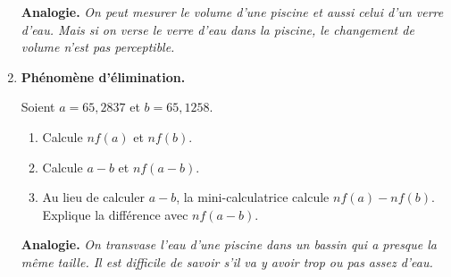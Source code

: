 \documentclass[class=report,crop=false, 12pt]{standalone}
\begin{document}
\begin{activite}
\begin{enumerate}
  
    \textbf{Analogie.} \emph{On peut mesurer le volume d'une piscine et aussi celui d'un verre d'eau. Mais si on verse le verre d'eau dans la piscine, le changement de volume n'est pas perceptible.} 
  
  \item \textbf{Phénomène d'élimination.}

    Soient $a = 65,2837$ et $b = 65,1258$.
  \begin{enumerate}
    \item Calcule $nf(a)$ et $nf(b)$.
    \item Calcule $a - b$ et $nf(a - b)$.
    \item Au lieu de calculer $a - b$, la mini-calculatrice calcule $nf(a) - nf(b)$. Explique la différence avec $nf(a - b)$.
  \end{enumerate}

    \textbf{Analogie.} \emph{On transvase l'eau d'une piscine dans un bassin qui a presque la même taille. Il est difficile de savoir s'il va y avoir trop ou pas assez d'eau.}
     
\end{enumerate}


\end{activite}
\end{document}
